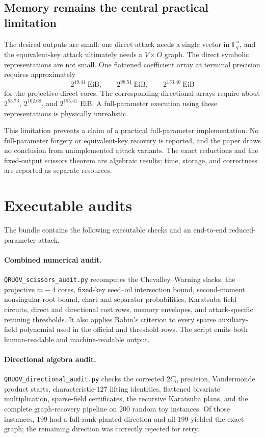 \documentclass[11pt,a4paper]{article}
\theoremstyle{definition}
\theoremstyle{remark}
\newcommand{\F}{\mathbb F}
\begin{document}
\subsection{Memory remains the central practical limitation}\label{subsec:memory-new}
The desired outputs are small: one direct attack needs a single vector in $\F_q^n$, and the equivalent-key attack ultimately needs a $V\times O$ graph.  The direct symbolic representations are not small.  One flattened coefficient
array at terminal precision requires approximately
\[
 2^{49.41}\ \mathrm{EiB},
 \qquad2^{98.51}\ \mathrm{EiB},
 \qquad2^{153.40}\ \mathrm{EiB}
\]
for the projective direct cores.  The corresponding directional arrays require
about $2^{53.73}$, $2^{102.68}$, and $2^{155.41}$ EiB.  A full-parameter
execution using these representations is physically unrealistic.

This limitation prevents a claim of a practical full-parameter implementation.  No full-parameter forgery or equivalent-key recovery is reported, and the paper draws no conclusion from unimplemented attack variants.  The exact reductions and the fixed-output scissors theorem are algebraic results; time, storage, and correctness are reported as separate resources.

\section{Executable audits}\label{sec:audits-new}
The bundle contains the following executable checks and an end-to-end reduced-parameter attack.

\paragraph{Combined numerical audit.}
\texttt{QRUOV\_scissors\_audit.py} recomputes the Chevalley--Warning slacks,
the projective $m-4$ cores, fixed-key seed--oil intersection bound,
second-moment nonsingular-root bound, chart and separator probabilities,
Karatsuba field circuits, direct and directional cost rows, memory envelopes,
and attack-specific retuning thresholds.  It also applies Rabin's criterion to
every sparse auxiliary-field polynomial used in the official and threshold
rows.  The script emits both human-readable and machine-readable output.

\paragraph{Directional algebra audit.}
\texttt{QRUOV\_directional\_audit.py} checks the corrected $2C_0$ precision,
Vandermonde product starts, characteristic-$127$ lifting identities, flattened
bivariate multiplication, sparse-field certificates, the recursive Karatsuba
plans, and the complete graph-recovery pipeline on $200$ random toy instances.  Of those instances, $199$ had a full-rank planted direction and all $199$ yielded the exact graph; the remaining direction was correctly rejected for retry.
\end{document}
